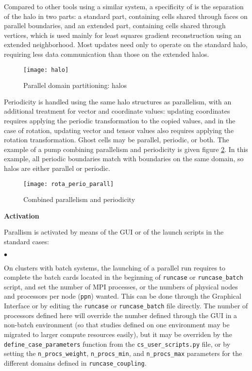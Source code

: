{{{Compared to other tools using a similar system, a specificity of
\CS is the separation of the halo in two parts: a standard part,
containing cells shared through faces on parallel boundaries, and an
extended part, containing cells shared through vertices, which is
used mainly for least squares gradient reconstruction using an
extended neighborhood. Most updates need only to operate on the standard
halo, requiring less data communication than those on the extended halos.

\begin{figure}[!h]
\centerline{
\texttt{[image: halo]}}
\caption{Parallel domain partitioning: halos}\label{Fig_haluile}
\end{figure}

Periodicity is handled using the same halo structures as parallelism,
with an additional treatment for vector and coordinate values: updating
coordinates requires applying the periodic transformation to the copied
values, and in the case of rotation, updating vector and tensor values
also requires applying the rotation transformation.
Ghost cells may be parallel, periodic, or both. The example of a pump
combining parallelism and periodicity is given figure \ref{Fig_parperio_pump}.
In this example, all periodic boundaries match with boundaries on
the same domain, so halos are either parallel or periodic.

\begin{figure}[!h]
\centerline{
\texttt{[image: rota\_perio\_parall]}}
\caption{Combined parallelism and periodicity}\label{Fig_parperio_pump}
\end{figure}

\label{prg_paralperio}
{\bf Activation}

Parallism is activated by means of the GUI or of the launch scripts
in the standard cases:
\begin{list}{$\bullet$}{}

\item On clusters with batch systems, the launching of a parallel run
      requires to complete the batch cards located in the
      beginning of \texttt{runcase} or \texttt{runcase\_batch}
      script, and set the number of MPI processes, or the numbers
      of physical nodes and processors per node (\texttt{ppn}) wanted.
      This can be done through the Graphical Interface or by editing
      the \texttt{runcase}  or \texttt{runcase\_batch} file directly.
      The number of processors defined here will override the number
      defined through the GUI in a non-batch environment
      (so that studies defined on one environment may be migrated
      to larger compute resources easily), but it may be overriden
      by the \texttt{define\_case\_parameters} function from
      the \texttt{cs\_user\_scripts.py} file, or by setting the
      \texttt{n\_procs\_weight}, \texttt{n\_procs\_min}, and
      \texttt{n\_procs\_max} parameters for the different domains
      defined in \texttt{runcase\_coupling}.


\end{list}}}}
